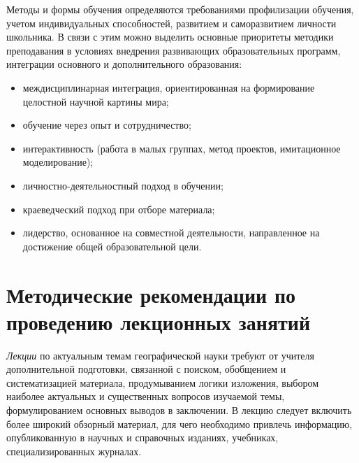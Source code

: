 \documentclass[
  11pt,
  russian,
]{book}
\begin{document}
Методы и формы обучения определяются требованиями профилизации обучения,
учетом индивидуальных способностей, развитием и саморазвитием личности
школьника. В связи с этим можно выделить основные приоритеты методики
преподавания в условиях внедрения развивающих образовательных программ,
интеграции основного и дополнительного образования:

\begin{itemize}
\item
  междисциплинарная интеграция, ориентированная на формирование
  целостной научной картины мира;
\item
  обучение через опыт и сотрудничество;
\item
  интерактивность (работа в малых группах, метод проектов, имитационное
  моделирование);
\item
  личностно-деятельностный подход в обучении;
\item
  краеведческий подход при отборе материала;
\item
  лидерство, основанное на совместной деятельности, направленное на
  достижение общей образовательной цели.
\end{itemize}

\hypertarget{ux43cux435ux442ux43eux434ux438ux447ux435ux441ux43aux438ux435-ux440ux435ux43aux43eux43cux435ux43dux434ux430ux446ux438ux438-ux43fux43e-ux43fux440ux43eux432ux435ux434ux435ux43dux438ux44e-ux43bux435ux43aux446ux438ux43eux43dux43dux44bux445-ux437ux430ux43dux44fux442ux438ux439}{%
\section*{Методические рекомендации по проведению лекционных
занятий}\label{ux43cux435ux442ux43eux434ux438ux447ux435ux441ux43aux438ux435-ux440ux435ux43aux43eux43cux435ux43dux434ux430ux446ux438ux438-ux43fux43e-ux43fux440ux43eux432ux435ux434ux435ux43dux438ux44e-ux43bux435ux43aux446ux438ux43eux43dux43dux44bux445-ux437ux430ux43dux44fux442ux438ux439}}

\emph{Лекции} по актуальным темам географической науки требуют от
учителя дополнительной подготовки, связанной с поиском, обобщением и
систематизацией материала, продумыванием логики изложения, выбором
наиболее актуальных и существенных вопросов изучаемой темы,
формулированием основных выводов в заключении. В лекцию следует включить
более широкий обзорный материал, для чего необходимо привлечь
информацию, опубликованную в научных и справочных изданиях, учебниках,
специализированных журналах.
\end{document}
